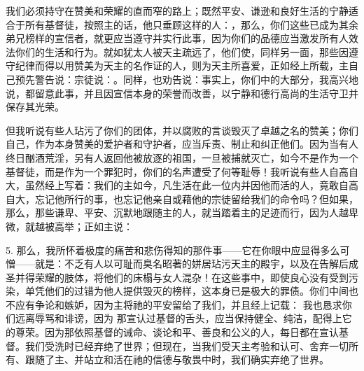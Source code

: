 我们必须持守在赞美和荣耀的直而窄的路上；既然平安、谦逊和良好生活的宁静适合于所有基督徒，按照主的话，他只垂顾这样的人：，那么，你们这些已成为其余弟兄榜样的宣信者，就更应当遵守并实行此事，因为你们的品德应当激发所有人效法你们的生活和行为。就如犹太人被天主疏远了，他们使，同样另一面，那些因遵守纪律而得以用赞美为天主的名作证的人，则为天主所喜爱，正如经上所载，主自己预先警告说：宗徒说：。同样，也劝告说：事实上，你们中的大部分，我高兴地说，都留意此事，并且因宣信本身的荣誉而改善，以宁静和德行高尚的生活守卫并保存其光荣。\par

但我听说有些人玷污了你们的团体，并以腐败的言谈毁灭了卓越之名的赞美；你们自己，作为本身赞美的爱护者和守护者，应当斥责、制止和纠正他们。因为当有人终日酗酒荒淫，另有人返回他被放逐的祖国，一旦被捕就灭亡，如今不是作为一个基督徒，而是作为一个罪犯时，你们的名声遭受了何等耻辱！我听说有些人自高自大，虽然经上写着：我们的主如今，凡生活在此一位内并因他而活的人，竟敢自高自大，忘记他所行的事，也忘记他亲自或藉他的宗徒留给我们的命令吗？但如果，那么，那些谦卑、平安、沉默地跟随主的人，就当踏着主的足迹而行，因为人越卑微，就越被高举；正如主说：\par

5. 那么，我所怀着极度的痛苦和悲伤得知的那件事——它在你眼中应显得多么可憎——就是：不乏有人以可耻而臭名昭著的姘居玷污天主的殿宇，以及在告解后成圣并得荣耀的肢体，将他们的床榻与女人混杂！在这些事中，即使良心没有受到污染，单凭他们的过错为他人提供毁灭的榜样，这本身已是极大的罪债。你们中间也不应有争论和嫉妒，因为主将祂的平安留给了我们，并且经上记载：    我也恳求你们远离辱骂和诽谤，因为 那宣认过基督的舌头，应当保持健全、纯洁，配得上它的尊荣。因为那依照基督的诫命、谈论和平、善良和公义的人，每日都在宣认基督。我们受洗时已经弃绝了世界；但现在，当我们受天主考验和认可、舍弃一切所有、跟随了主、并站立和活在祂的信德与敬畏中时，我们确实弃绝了世界。\par


